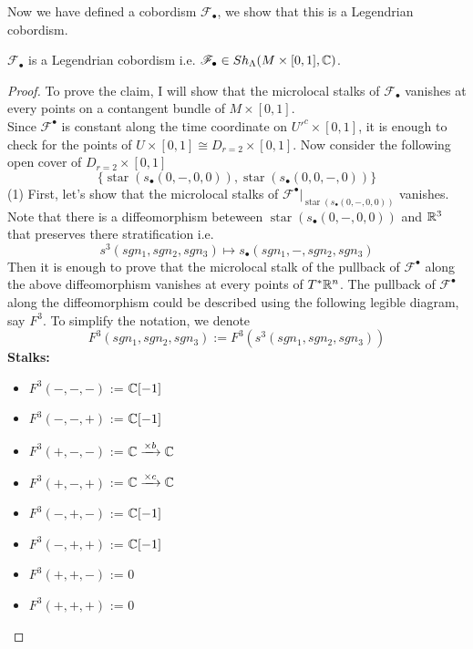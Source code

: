 Now we have defined a cobordism $\mathscr{F}_\bullet$, we show that this is a Legendrian cobordism.
\begin{proposition}
$\mathscr{F}_\bullet$ is a Legendrian cobordism i.e. $\mathscr{F}_\bullet \in Sh_\Lambda(M \times [0,1],\mathbb{C})$.
\end{proposition}
\begin{proof}
To prove the claim, I will show that the microlocal stalks of $\mathscr{F}_\bullet$ vanishes at every points on a contangent bundle of $M\times [0,1]$.\\
Since $\mathscr{F}^\bullet$ is constant along the time coordinate on $U'^c \times [0,1]$, it is enough to check for the points of $U\times [0,1] \cong D_{r=2}\times [0,1]$. Now consider the following open cover of $D_{r=2}\times [0,1]$
\[
\{\operatorname{star}(s_\bullet(0,-,0,0)),\operatorname{star}(s_\bullet(0,0,-,0))\}
\] 
(1) First, let's show that the microlocal stalks of $\mathscr{F}^\bullet|_{\operatorname{star}(s_\bullet(0,-,0,0))}$ vanishes. Note that there is a diffeomorphism beteween $\operatorname{star}(s_\bullet(0,-,0,0))$ and $\mathbb{R}^3$ that preserves there stratification i.e.
\[
s^3(sgn_1,sgn_2,sgn_3) \mapsto s_\bullet(sgn_1,-,sgn_2,sgn_3)
\]
Then it is enough to prove that the microlocal stalk of the pullback of $\mathscr{F}^\bullet$ along the above diffeomorphism vanishes at every points of $T^*\mathbb{R}^n$. The pullback of $\mathscr{F}^\bullet$ along the diffeomorphism could be described using the following legible diagram, say $F^3$. To simplify the notation, we denote
\[
F^3(sgn_1,sgn_2,sgn_3):= F^3(s^3(sgn_1,sgn_2,sgn_3))
\]
\textbf{Stalks:}
\begin{itemize}
\item $F^3(-,-,-)$ := $\mathbb{C}[-1]$
\item $F^3(-,-,+)$ := $\mathbb{C}[-1]$
\item $F^3(+,-,-)$ := $\mathbb{C}\xrightarrow{\times b} \mathbb{C}$
\item $F^3(+,-,+)$ := $\mathbb{C}\xrightarrow{\times c} \mathbb{C}$
\item $F^3(-,+,-)$ := $\mathbb{C}[-1]$
\item $F^3(-,+,+)$ := $\mathbb{C}[-1]$
\item $F^3(+,+,-)$ := $0$
\item $F^3(+,+,+)$ := $0$
\end{itemize}


\end{proof}
